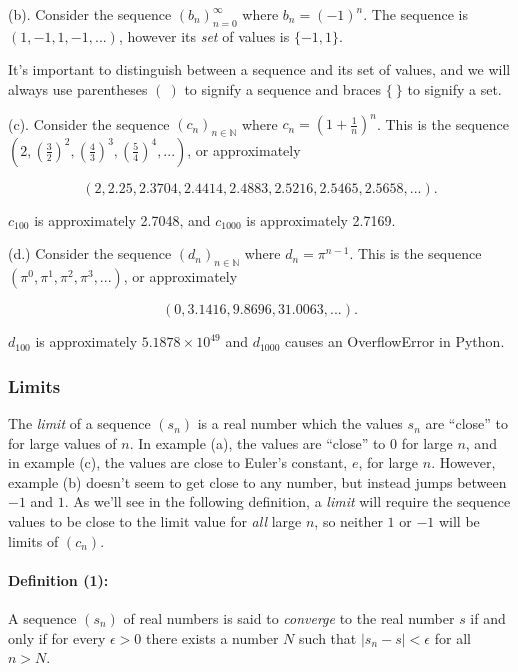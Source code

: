 \documentclass[]{article}
\begin{document}
(b). Consider the sequence $(b_n)_{n = 0}^{\infty}$ where
$b_n = (-1)^n$. The sequence is $(1,-1,1,-1,...)$, however its
\emph{set} of values is $\{-1,1\}$.

It's important to distinguish between a sequence and its set of values,
and we will always use parentheses $( \ )$ to signify a sequence and
braces $\{ \ \}$ to signify a set.

(c). Consider the sequence $(c_n)_{n \in \mathbb{N}}$ where
$c_n = (1 + \frac{1}{n})^n$. This is the sequence
$(2, (\frac{3}{2})^2, (\frac{4}{3})^3, (\frac{5}{4})^4, ...)$, or
approximately

\[ (2, 2.25, 2.3704, 2.4414, 2.4883, 2.5216, 2.5465, 2.5658, ...). \]

$c_{100}$ is approximately 2.7048, and $c_{1000}$ is approximately
2.7169.

(d.) Consider the sequence $(d_n)_{n \in \mathbb{N}}$ where
$d_n = \pi^{n-1}$. This is the sequence
$(\pi^0, \pi^1, \pi^2, \pi^3, ...)$, or approximately

\[ (0, 3.1416, 9.8696, 31.0063, ...). \]

$d_{100}$ is approximately $5.1878 \times 10^{49}$ and $d_{1000}$ causes
an OverflowError in Python.

\subsubsection{Limits}

The \emph{limit} of a sequence $(s_n)$ is a real number which the values
$s_n$ are ``close'' to for large values of $n$. In example (a), the
values are ``close'' to 0 for large $n$, and in example (c), the values
are close to Euler's constant, $e$, for large $n$. However, example (b)
doesn't seem to get close to any number, but instead jumps between $-1$
and $1$. As we'll see in the following definition, a \emph{limit} will
require the sequence values to be close to the limit value for
\emph{all} large $n$, so neither $1$ or $-1$ will be limits of $(c_n)$.

\paragraph{Definition (1):}

A sequence $(s_n)$ of real numbers is said to \emph{converge} to the
real number $s$ if and only if for every $\epsilon > 0$ there exists a
number $N$ such that $\vert s_n - s\vert  < \epsilon$ for all $n > N$.
\end{document}
